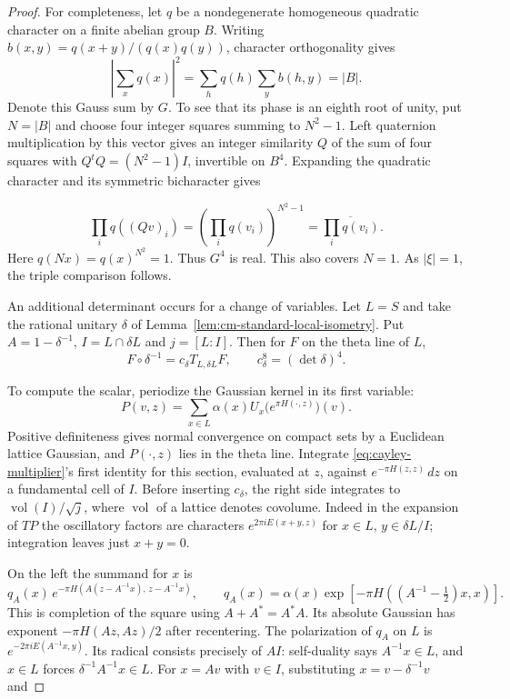 \begin{proof}
For completeness, let \(q\) be a nondegenerate homogeneous
quadratic character on a finite abelian group \(B\). Writing \(b(x,y)=q(x+y)/(q(x)q(y))\), character orthogonality gives
\[
  \left|\sum_xq(x)\right|^2=\sum_h q(h)\sum_y b(h,y)=|B|.
\]
Denote this Gauss sum by \(G\). To see that its
phase is an eighth root of unity, put \(N=|B|\) and choose
four integer squares summing to \(N^2-1\). Left quaternion
multiplication by this vector gives an integer similarity
\(Q\) of the sum of four squares with
\(Q^{t}Q=(N^2-1)I\), invertible on \(B^4\).
Expanding the quadratic character and its symmetric
bicharacter gives

\[
  \prod_i q((Qv)_i)=(\prod_i q(v_i))^{N^2-1}
=\overline{\prod_i q(v_i)}.
\]
 Here \(q(Nx)=q(x)^{N^2}=1\).
Thus \(G^4\) is real. This also covers \(N=1\).
As \(|\xi|=1\), the triple comparison follows.

An additional determinant occurs for a change of variables.
Let \(L=S\) and take the rational unitary \(\delta\) of
Lemma~\ref{lem:cm-standard-local-isometry}. Put
\(A=1-\delta^{-1}\), \(I=L\cap\delta L\) and \(j=[L:I]\).
Then for \(F\) on the theta line of \(L\),
\begin{equation}\label{eq:cayley-multiplier}
   F\circ\delta^{-1}=c_\delta T_{L,\delta L}F,\qquad
              c_\delta^8=(\det\delta)^4 .
\end{equation}

To compute the scalar, periodize the Gaussian kernel in its
first variable:
\[
 P(v,z)=\sum_{x\in L}\alpha(x)
      U_x\big(e^{\pi H(\cdot,z)}\big)(v).
\]
Positive definiteness gives normal convergence on compact sets
by a Euclidean lattice Gaussian, and \(P(\cdot,z)\) lies in the
theta line. Integrate \eqref{eq:cayley-multiplier}'s first
identity for this section, evaluated at \(z\), against
\(e^{-\pi H(z,z)}\,dz\) on a fundamental cell of \(I\).
Before inserting \(c_\delta\), the right side integrates to
\(\operatorname{vol}(I)/\sqrt j\), where \(\operatorname{vol}\)
of a lattice denotes covolume. Indeed in the expansion of
\(T P\) the oscillatory factors are characters
\(e^{2\pi i E(x+y,z)}\) for \(x\in L\), \(y\in\delta L/I\);
integration leaves just \(x+y=0\).

On the left the summand for \(x\) is
\[
 q_A(x)\,e^{-\pi H(A(z-A^{-1}x),\,z-A^{-1}x)},\qquad
 q_A(x)=\alpha(x)\exp[-\pi H((A^{-1}-\tfrac12)x,x)] .
\]
This is completion of the square using
\(A+A^*=A^*A\). Its absolute Gaussian has exponent
\(-\pi H(Az,Az)/2\) after recentering. The polarization
of \(q_A\) on \(L\) is \(e^{-2\pi i E(A^{-1}x,y)}\).
Its radical consists precisely of \(AI\): self-duality
says \(A^{-1}x\in L\), and \(x\in L\) forces
\(\delta^{-1}A^{-1}x\in L\). For \(x=Av\) with \(v\in I\),
substituting \(x=v-\delta^{-1}v\) and


\end{proof}
